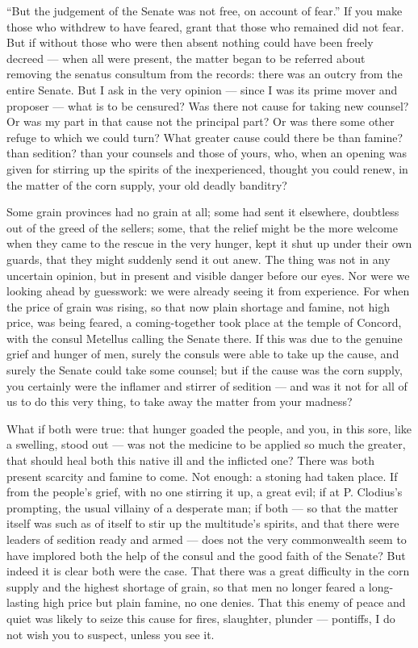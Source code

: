  ``But the judgement of the Senate was not free, on account of fear.'' If you make those who withdrew to have feared, grant that those who remained did not fear. But if without those who were then absent nothing could have been freely decreed --- when all were present, the matter began to be referred about removing the senatus consultum from the records: there was an outcry from the entire Senate. But I ask in the very opinion --- since I was its prime mover and proposer --- what is to be censured? Was there not cause for taking new counsel? Or was my part in that cause not the principal part? Or was there some other refuge to which we could turn? What greater cause could there be than famine? than sedition? than your counsels and those of yours, who, when an opening was given for stirring up the spirits of the inexperienced, thought you could renew, in the matter of the corn supply, your old deadly banditry?

 Some grain provinces had no grain at all; some had sent it elsewhere, doubtless out of the greed of the sellers; some, that the relief might be the more welcome when they came to the rescue in the very hunger, kept it shut up under their own guards, that they might suddenly send it out anew. The thing was not in any uncertain opinion, but in present and visible danger before our eyes. Nor were we looking ahead by guesswork: we were already seeing it from experience. For when the price of grain was rising, so that now plain shortage and famine, not high price, was being feared, a coming-together took place at the temple of Concord, with the consul Metellus calling the Senate there. If this was due to the genuine grief and hunger of men, surely the consuls were able to take up the cause, and surely the Senate could take some counsel; but if the cause was the corn supply, you certainly were the inflamer and stirrer of sedition --- and was it not for all of us to do this very thing, to take away the matter from your madness?

 What if both were true: that hunger goaded the people, and you, in this sore, like a swelling, stood out --- was not the medicine to be applied so much the greater, that should heal both this native ill and the inflicted one? There was both present scarcity and famine to come. Not enough: a stoning had taken place. If from the people's grief, with no one stirring it up, a great evil; if at P. Clodius's prompting, the usual villainy of a desperate man; if both --- so that the matter itself was such as of itself to stir up the multitude's spirits, and that there were leaders of sedition ready and armed --- does not the very commonwealth seem to have implored both the help of the consul and the good faith of the Senate? But indeed it is clear both were the case. That there was a great difficulty in the corn supply and the highest shortage of grain, so that men no longer feared a long-lasting high price but plain famine, no one denies. That this enemy of peace and quiet was likely to seize this cause for fires, slaughter, plunder --- pontiffs, I do not wish you to suspect, unless you see it.

